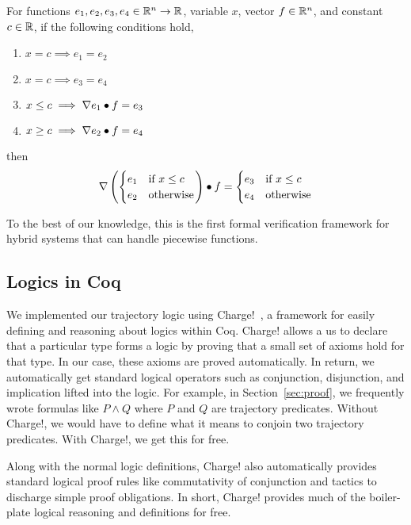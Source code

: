 \begin{lemma}
For functions $e_1, e_2, e_3, e_4 \in \mathbb{R}^n \rightarrow \mathbb{R}$, variable $x$,
vector $f \in \mathbb{R}^n$, and constant $c \in \mathbb{R}$, if the following conditions
hold,
\begin{enumerate}[label=\roman*), ref=\roman*]
\item $x = c \implies e_1 = e_2$
\item $x = c \implies e_3 = e_4$
\item $x \leq c \implies \nabla e_1 \bullet f = e_3$
\item $x \geq c \implies \nabla e_2 \bullet f = e_4$
\end{enumerate}
then
\[
\nabla \left(
\begin{cases}
e_1 & \text{if } x \leq c \\
e_2 & \text{otherwise}
\end{cases}
\right)
\bullet
f
=
\begin{cases}
e_3 & \text{if } x \leq c \\
e_4 & \text{otherwise}
\end{cases}
\]
\label{lem:pw-deriv}
\end{lemma}

To the best of our knowledge, this is the first formal verification
framework for hybrid systems that can handle piecewise functions.

\subsection{Logics in Coq}
We implemented our trajectory logic using Charge!~\cite{???}, a framework
for easily defining and reasoning about logics within Coq. Charge! allows a
us to declare that a particular type forms a logic by proving that a small
set of axioms hold for that type. In our case, these axioms are proved
automatically. In return, we automatically get standard logical operators
such as conjunction, disjunction, and implication lifted into the
logic. For example, in Section~\ref{sec:proof}, we frequently wrote
formulas like $P \wedge Q$ where $P$ and $Q$ are trajectory
predicates. Without Charge!, we would have to define what it means to
conjoin two trajectory predicates. With Charge!, we get this for free.

Along with the normal logic definitions, Charge! also automatically
provides standard logical proof rules like commutativity of conjunction and
tactics to discharge simple proof obligations. In short, Charge! provides
much of the boiler-plate logical reasoning and definitions for free.


